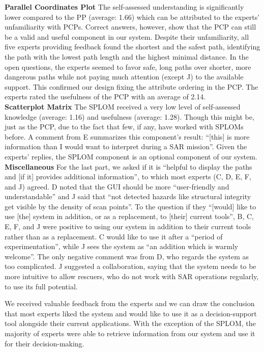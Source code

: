 \documentclass[conference,10pt,letter]{IEEEtran}
\begin{document}
%
\noindent \textbf{Parallel Coordinates Plot} The self-assessed understanding is significantly lower compared to the PP (average: 1.66) which can be attributed to the experts' unfamiliarity with PCPs. Correct answers, however, show that the PCP can still be a valid and useful component in our system. Despite their unfamiliarity, all five experts providing feedback found the shortest and the safest path, identifying the path with the lowest path length and the highest minimal distance. In the open questions, the experts seemed to favor safe, long paths over shorter, more dangerous paths while not paying much attention (except J) to the available support. This confirmed our design fixing the attribute ordering in the PCP. The experts rated the usefulness of the PCP with an average of 2.14. \\
%
\noindent \textbf{Scatterplot Matrix} The SPLOM received a very low level of self-assessed knowledge (average: 1.16) and usefulness (average: 1.28). Though this might be, just as the PCP, due to the fact that few, if any, have worked with SPLOMs before. A comment from E summarizes this component's result: ``[this] is more information than I would want to interpret during a SAR mission''. Given the experts' replies, the SPLOM component is an optional component of our system. \\
%
\noindent \textbf{Miscellaneous} For the last part, we asked if it is ``helpful to display the paths and [if it] provides additional information'', to which most experts (C, D, E, F, and J) agreed. D noted that the GUI should be more ``user-friendly and understandable'' and J said that ``not detected hazards like structural integrity get visible by the density of scan points''. To the question if they ``[would] like to use [the] system in addition, or as a replacement, to [their] current tools'', B, C, E, F, and J were positive to using our system in addition to their current tools rather than as a replacement. C would like to use it after a ``period of experimentation'', while J sees the system as ``an addition which is warmly welcome''. The only negative comment was from D, who regards the system as too complicated. J suggested a collaboration, saying that the system needs to be more intuitive to allow rescuers, who do not work with SAR operations regularly, to use its full potential.

We received valuable feedback from the experts and we can draw the conclusion that most experts liked the system and would like to use it as a decision-support tool alongside their current applications. With the exception of the SPLOM, the majority of experts were able to retrieve information from our system and use it for their decision-making.
\end{document}
